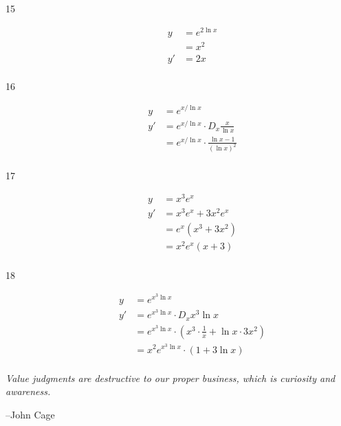 \documentclass{exam}
\begin{document}
\begin{description}
\item[15]
\begin{align*}
  y &= e^{2 \ln x} \\
    &= x^2 \\
  y' &= 2x \\
\end{align*}

\item[16]
\begin{align*}
  y &= e^{x/\ln x} \\
  y' &= e^{x/\ln x} \cdot D_x \frac{x}{\ln x} \\
     &= e^{x/\ln x} \cdot \frac{\ln x - 1}{(\ln x)^2} \\
\end{align*}

\item[17]
\begin{align*}
  y &= x^3 e^x \\
  y' &= x^3 e^x + 3x^2 e^x \\
     &= e^x (x^3 + 3x^2) \\
     &= x^2 e^x (x + 3) \\
\end{align*}

\item[18]
\begin{align*}
  y &= e^{x^3 \ln x} \\
  y' &= e^{x^3 \ln x} \cdot D_x x^3 \ln x \\
     &= e^{x^3 \ln x} \cdot (x^3 \cdot \frac{1}{x} + \ln x \cdot 3x^2) \\
     &= x^2 e^{x^3 \ln x} \cdot (1 + 3 \ln x) \\
\end{align*}


\end{description}

\else

\vspace{11 cm} {\em Value judgments are destructive to our proper business, which is curiosity and awareness.}

\hspace{0.5 cm} --John Cage

\fi
\end{document}
